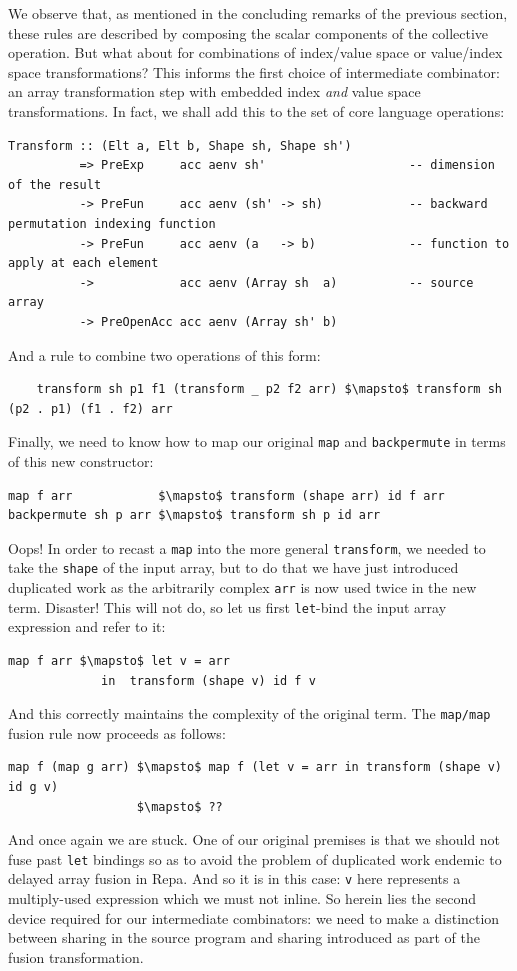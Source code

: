 We observe that, as mentioned in the concluding remarks of the previous section,
these rules are described by composing the scalar components of the collective
operation. But what about for combinations of index/value space or value/index
space transformations? This informs the first choice of intermediate combinator:
an array transformation step with embedded index \emph{and} value space
transformations. In fact, we shall add this to the set of core language
operations:
%
\begin{lstlisting}[style=haskell,numbers=none]
Transform :: (Elt a, Elt b, Shape sh, Shape sh')
          => PreExp     acc aenv sh'                    -- dimension of the result
          -> PreFun     acc aenv (sh' -> sh)            -- backward permutation indexing function
          -> PreFun     acc aenv (a   -> b)             -- function to apply at each element
          ->            acc aenv (Array sh  a)          -- source array
          -> PreOpenAcc acc aenv (Array sh' b)
\end{lstlisting}
%
And a rule to combine two operations of this form:
%
\begin{lstlisting}[style=haskell,numbers=none,mathescape]
%\bf$\langle$ RULE: transform/transform $\rangle$%
    transform sh p1 f1 (transform _ p2 f2 arr) $\mapsto$ transform sh (p2 . p1) (f1 . f2) arr
\end{lstlisting}
%
Finally, we need to know how to map our original \texttt{map} and
\texttt{backpermute} in terms of this new constructor:
%
\begin{lstlisting}[style=haskell,numbers=none,mathescape]
map f arr            $\mapsto$ transform (shape arr) id f arr
backpermute sh p arr $\mapsto$ transform sh p id arr
\end{lstlisting}
%
Oops! In order to recast a \texttt{map} into the more general
\texttt{transform}, we needed to take the \texttt{shape} of the input array, but
to do that we have just introduced duplicated work as the arbitrarily complex
\texttt{arr} is now used twice in the new term. Disaster! This will not do, so
let us first \texttt{let}-bind the input array expression and refer to it:
%
\begin{lstlisting}[style=haskell,numbers=none,mathescape]
map f arr $\mapsto$ let v = arr
             in  transform (shape v) id f v
\end{lstlisting}
%
And this correctly maintains the complexity of the original term. The
\texttt{map/map} fusion rule now proceeds as follows:
%
\begin{lstlisting}[style=haskell,numbers=none,mathescape]
map f (map g arr) $\mapsto$ map f (let v = arr in transform (shape v) id g v)
                  $\mapsto$ ??
\end{lstlisting}
%
And once again we are stuck. One of our original premises is that we should not
fuse past \texttt{let} bindings so as to avoid the problem of duplicated work
endemic to delayed array fusion in Repa. And so it is in this case: \texttt{v}
here represents a multiply-used expression which we must not inline. So herein
lies the second device required for our intermediate combinators: we need to
make a distinction between sharing in the source program and sharing introduced
as part of the fusion transformation.

